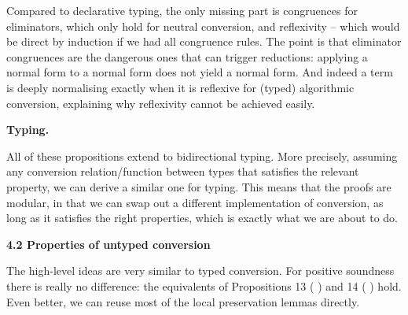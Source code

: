  
 
 
Compared to declarative typing, the only missing part is congruences for eliminators, which only hold for neutral conversion, and reflexivity – which would be direct by induction if we had all congruence rules. The point is that eliminator congruences are the dangerous ones that can trigger reductions: applying a normal form to a normal form does not yield a normal form. And indeed a term is deeply normalising exactly when it is reflexive for (typed) algorithmic conversion, explaining why reflexivity cannot be achieved easily.\par
 
 
 
 
\par\medskip\noindent\textbf{Typing.}\par
 
 
All of these propositions extend to bidirectional typing. More precisely, assuming any conversion relation/function between types that satisfies the relevant property, we can derive a similar one for typing. This means that the proofs are modular, in that we can swap out a different implementation of conversion, as long as it satisfies the right properties, which is exactly what we are about to do.\par
 
 
 


 
\par\medskip\noindent\textbf{4.2 Properties of untyped conversion}\par
 
 
The high-level ideas are very similar to typed conversion. For positive soundness there is really no difference: the equivalents of Propositions 13 ( ) and 14 ( ) hold. Even better, we can reuse most of the local preservation lemmas directly.\par
 
 
